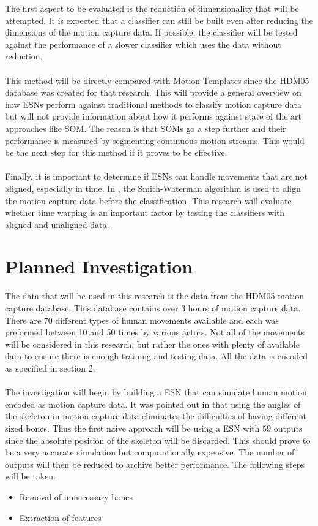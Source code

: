 \documentclass[10pt]{article}
\begin{document}
The first aspect to be evaluated is the reduction of dimensionality that will be attempted. It is expected that a classifier can still be built even after reducing the dimensions of the motion capture data. If possible, the classifier will be tested against the performance of a slower classifier which uses the data without reduction.
\\\\
This method will be directly compared with Motion Templates\cite{MotionTemplates} since the HDM05 database was created for that research. This will provide a general overview on how ESNs perform against traditional methods to classify motion capture data but will not provide information about how it performs against state of the art approaches like SOM\cite{EfficientMotionIndexing}. The reason is that SOMs go a step further and their performance is measured by segmenting continuous motion streams. This would be the next step for this method if it proves to be effective.
\\\\
Finally, it is important to determine if ESNs can handle movements that are not aligned, especially in time. In \cite{EfficientMotionIndexing}, the Smith-Waterman algorithm is used to align the motion capture data before the classification. This research will evaluate whether time warping is an important factor by testing the classifiers with aligned and unaligned data.

\section{Planned Investigation}

The data that will be used in this research is the data from the HDM05 motion capture database. This database contains over 3 hours of motion capture data. There are 70 different types of human movements available and each was preformed between 10 and 50 times by various actors. Not all of the movements will be considered in this research, but rather the ones with plenty of available data to ensure there is enough training and testing data. All the data is encoded as specified in section 2.
\\\\
The investigation will begin by building a ESN that can simulate human motion encoded as motion capture data. It was pointed out in \cite{EfficientMotionIndexing} that using the angles of the skeleton in motion capture data eliminates the difficulties of having different sized bones. Thus the first naive approach will be using a ESN with $59$ outputs since the absolute position of the skeleton will be discarded. This should prove to be a very accurate simulation but computationally expensive. The number of outputs will then be reduced to archive better performance. The following steps will be taken:
\begin{itemize}
  \item Removal of unnecessary bones
  \item Extraction of features
\end{itemize}
\end{document}
